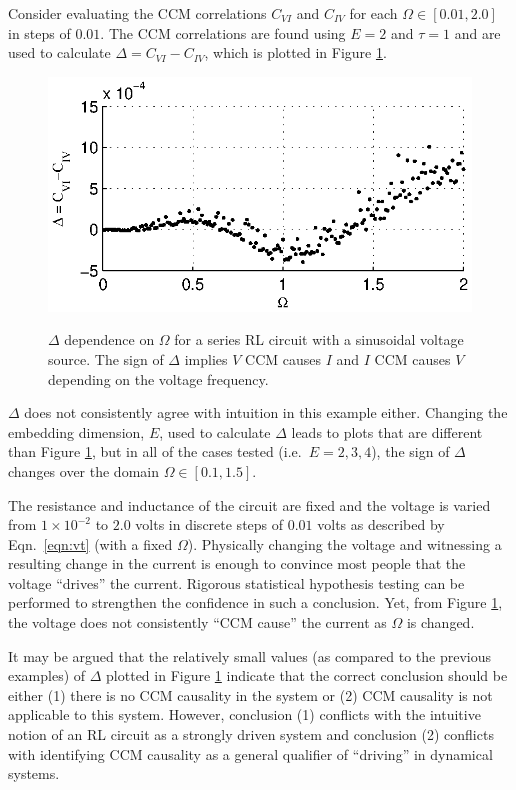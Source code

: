 \documentclass[twocolumn,aps,pre,groupedaddress]{revtex4-1}
\begin{document}
Consider evaluating the CCM correlations $C_{VI}$ and $C_{IV}$ for each $\Omega\in[0.01,2.0]$ in steps of $0.01$.  The CCM correlations are found using $E=2$ and $\tau=1$ and are used to calculate $\Delta = C_{VI}-C_{IV}$, which is plotted in Figure \ref{fig:Av}.
\begin{figure}[ht]
\includegraphics[scale=0.9]{RLCircuitVaryV_Freq.eps} \\
\caption{$\Delta$ dependence on $\Omega$ for a series RL circuit with a sinusoidal voltage source.  The sign of $\Delta$ implies $V$ CCM causes $I$ and $I$ CCM causes $V$ depending on the voltage frequency.}
\label{fig:Av}
\end{figure}
$\Delta$ does not consistently agree with intuition in this example either.  Changing the embedding dimension, $E$, used to calculate $\Delta$ leads to plots that are different than Figure \ref{fig:Av}, but in all of the cases tested (i.e.\ $E=2,3,4$), the sign of $\Delta$ changes over the domain $\Omega\in[0.1,1.5]$. 

The resistance and inductance of the circuit are fixed and the voltage is varied from $1\times 10^{-2}$ to $2.0$ volts in discrete steps of $0.01$ volts as described by Eqn.\ \ref{eqn:vt} (with a fixed $\Omega$).  Physically changing the voltage and witnessing a resulting change in the current is enough to convince most people that the voltage ``drives'' the current.  Rigorous statistical hypothesis testing can be performed to strengthen the confidence in such a conclusion.  Yet, from Figure \ref{fig:Av}, the voltage does not consistently ``CCM cause'' the current as $\Omega$ is changed. 

It may be argued that the relatively small values (as compared to the previous examples) of $\Delta$ plotted in Figure \ref{fig:Av} indicate that the correct conclusion should be either (1) there is no CCM causality in the system or (2) CCM causality is not applicable to this system.  However, conclusion (1) conflicts with the intuitive notion of an RL circuit as a strongly driven system and conclusion (2) conflicts with identifying CCM causality as a general qualifier of ``driving'' in dynamical systems.
\end{document}
